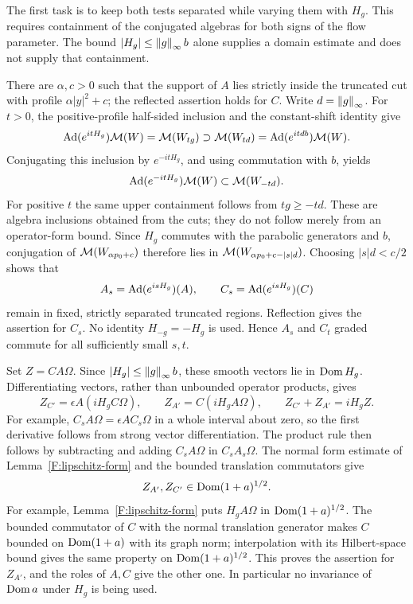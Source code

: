 The first task is to keep both tests separated while varying them with
$H_g$. This requires containment of the conjugated algebras for both
signs of the flow parameter. The bound $|H_g|\leq\left\lVert g\right\rVert_\infty b$
alone supplies a domain estimate and does not supply that containment.

There are $\alpha,c>0$ such that the support of $A$ lies strictly inside
the truncated cut with profile $\alpha|y|^2+c$; the reflected assertion
holds for $C$.  Write $d=\left\lVert g\right\rVert_\infty$.  For $t>0$, the positive-profile
half-sided inclusion and the constant-shift identity give
\[
 \operatorname{Ad}(e^{itH_g})\mathcal M(W)=\mathcal M(W_{tg})
       \supset\mathcal M(W_{td})=\operatorname{Ad}(e^{itdb})\mathcal M(W).
\]
Conjugating this inclusion by $e^{-itH_g}$, and using commutation
with $b$, yields
\[
 \operatorname{Ad}(e^{-itH_g})\mathcal M(W)\subset\mathcal M(W_{-td}).
\]
For positive $t$ the same upper containment follows from $tg\geq-td$.
These are algebra inclusions obtained from the cuts; they do not
follow merely from an operator-form bound.  Since $H_g$ commutes
with the parabolic generators and $b$, conjugation of
$\mathcal M(W_{\alpha p_0+c})$ therefore lies in
$\mathcal M(W_{\alpha p_0+c-|s|d})$.  Choosing $|s|d<c/2$ shows that
\[
 A_s=\operatorname{Ad}(e^{isH_g})(A),\qquad C_s=\operatorname{Ad}(e^{isH_g})(C)
\]
remain in fixed, strictly separated truncated regions.  Reflection
gives the assertion for $C_s$.  No identity $H_{-g}=-H_g$ is used.
Hence $A_s$ and $C_t$ graded commute for all sufficiently small $s,t$.

Set $Z=CA\Omega$.  Since $|H_g|\leq \left\lVert g\right\rVert_\infty b$, these smooth
vectors lie in $\operatorname{Dom} H_g$.  Differentiating vectors, rather than
unbounded operator products, gives
\begin{equation}\label{N:product-derivative}
 Z_{C'}=\epsilon A(iH_gC\Omega),\qquad
 Z_{A'}=C(iH_gA\Omega),\qquad
 Z_{C'}+Z_{A'}=iH_gZ.
\end{equation}
For example, $C_sA\Omega=\epsilon AC_s\Omega$ in a whole interval
about zero, so the first derivative follows from strong vector
differentiation.  The product rule then follows by subtracting and
adding $C_sA\Omega$ in $C_sA_s\Omega$.  The normal form estimate of
Lemma~\ref{F:lipschitz-form} and the bounded translation commutators give
\begin{equation}\label{N:normal-domain}
 Z_{A'},Z_{C'}\in\operatorname{Dom}(1+a)^{1/2}.
\end{equation}
For example, Lemma~\ref{F:lipschitz-form} puts $H_gA\Omega$ in
$\operatorname{Dom}(1+a)^{1/2}$. The bounded commutator of $C$ with the normal
translation generator makes $C$ bounded on $\operatorname{Dom}(1+a)$ with its graph
norm; interpolation with its Hilbert-space bound gives the same
property on $\operatorname{Dom}(1+a)^{1/2}$. This proves the assertion for $Z_{A'}$,
and the roles of $A,C$ give the other one. In particular no invariance
of $\operatorname{Dom} a$ under $H_g$ is being used.


